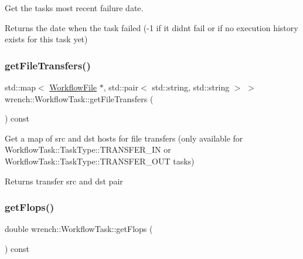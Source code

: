 Get the task\textquotesingle{}s most recent failure date. 

\begin{DoxyReturn}{Returns}
the date when the task failed (-\/1 if it didn\textquotesingle{}t fail or if no execution history exists for this task yet) 
\end{DoxyReturn}
\mbox{\label{classwrench_1_1_workflow_task_a1c453e7b1570418be500c9910372956b}} 
\subsubsection{\texorpdfstring{get\+File\+Transfers()}{getFileTransfers()}}
{\footnotesize\ttfamily std\+::map$<$ \hyperlink{classwrench_1_1_workflow_file}{Workflow\+File} $\ast$, std\+::pair$<$ std\+::string, std\+::string $>$ $>$ wrench\+::\+Workflow\+Task\+::get\+File\+Transfers (\begin{DoxyParamCaption}{ }\end{DoxyParamCaption}) const}



Get a map of src and dst hosts for file transfers (only available for Workflow\+Task\+::\+Task\+Type\+::\+T\+R\+A\+N\+S\+F\+E\+R\+\_\+\+IN or Workflow\+Task\+::\+Task\+Type\+::\+T\+R\+A\+N\+S\+F\+E\+R\+\_\+\+O\+UT tasks) 

\begin{DoxyReturn}{Returns}
transfer src and dst pair 
\end{DoxyReturn}
\mbox{\label{classwrench_1_1_workflow_task_aec0aab3ed552960729a60d1d3c4a3de2}} 
\subsubsection{\texorpdfstring{get\+Flops()}{getFlops()}}
{\footnotesize\ttfamily double wrench\+::\+Workflow\+Task\+::get\+Flops (\begin{DoxyParamCaption}{ }\end{DoxyParamCaption}) const}




